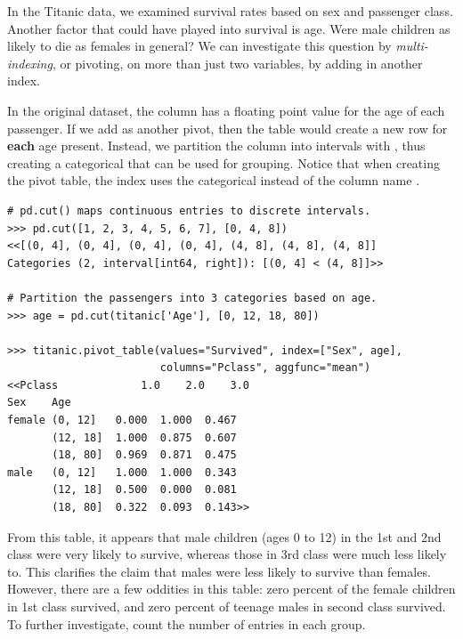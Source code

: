In the Titanic data, we examined survival rates based on sex and passenger class.
Another factor that could have played into survival is age.
Were male children as likely to die as females in general?
We can investigate this question by \emph{multi-indexing}, or pivoting, on more than just two variables, by adding in another index.

In the original dataset, the  column has a floating point value for the age of each passenger.
If we add  as another pivot, then the table would create a new row for \textbf{each} age present.
Instead, we partition the  column into intervals with , thus creating a categorical that can be used for grouping.
Notice that when creating the pivot table, the index uses the categorical  instead of the column name .


\begin{lstlisting}
# pd.cut() maps continuous entries to discrete intervals.
>>> pd.cut([1, 2, 3, 4, 5, 6, 7], [0, 4, 8])
<<[(0, 4], (0, 4], (0, 4], (0, 4], (4, 8], (4, 8], (4, 8]]
Categories (2, interval[int64, right]): [(0, 4] < (4, 8]]>>

# Partition the passengers into 3 categories based on age.
>>> age = pd.cut(titanic['Age'], [0, 12, 18, 80])

>>> titanic.pivot_table(values="Survived", index=["Sex", age],
                        columns="Pclass", aggfunc="mean")
<<Pclass             1.0    2.0    3.0
Sex    Age
female (0, 12]   0.000  1.000  0.467
       (12, 18]  1.000  0.875  0.607
       (18, 80]  0.969  0.871  0.475
male   (0, 12]   1.000  1.000  0.343
       (12, 18]  0.500  0.000  0.081
       (18, 80]  0.322  0.093  0.143>>
\end{lstlisting}

From this table, it appears that male children (ages 0 to 12) in the 1st and 2nd class were very likely to survive, whereas those in 3rd class were much less likely to.
This clarifies the claim that males were less likely to survive than females.
However, there are a few oddities in this table: zero percent of the female children in 1st class survived, and zero percent of teenage males in second class survived.
To further investigate, count the number of entries in each group.

%

